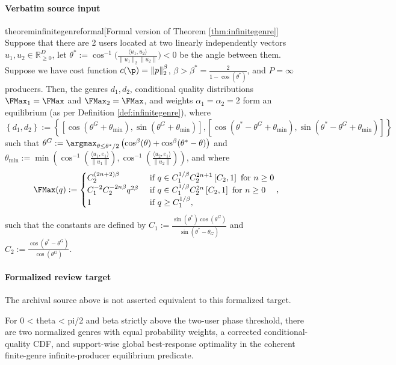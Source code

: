 \documentclass[10pt]{article}
\begin{document}
\paragraph{Verbatim source input}
\begin{ReviewVerbatim}
\begin{restatable}{theorem}{infinitegenreformal}[Formal version of Theorem \ref{thm:infinitegenre}]
\label{thm:infinitegenreformal}
Suppose that there are 2 users located at two linearly independently vectors $u_1, u_2 \in \mathbb{R}_{\ge 0}^D$, let $\theta^* := \cos^{-1}\Big( \frac{\langle u_1, u_2\rangle}{\|u_1\|_2 \|u_2\|} \Big) < 0$ be the angle between them.  Suppose we have cost function $c(\p) = \|p\|_2^{\beta}$, $\beta > \beta^* = \frac{2}{1 - \cos(\theta^*)}$, and $P = \infty$ producers. Then, the genres $d_1, d_2$, conditional quality distributions $\FMax_1 = \FMax$ and $\FMax_2 = \FMax$, and weights $\alpha_1 = \alpha_2 = 2$ form an equilibrium (as per  Definition \ref{def:infinitegenre}), where
\[\left\{d_1, d_2 \right\} := \left\{[\cos(\theta^G + \theta_{\text{min}}), \sin(\theta^G + \theta_{\text{min}})], [\cos(\theta^* - \theta^G + \theta_{\text{min}}), \sin(\theta^* - \theta^G + \theta_{\text{min}})] \right\} \]
such that $\theta^G := \argmax_{\theta \le \theta^*/2} \left(\cos^{\beta}(\theta) + \cos^{\beta}(\theta^* - \theta)\right)$ and $\theta_{\text{min}} := \min\left(\cos^{-1}\left(\frac{\langle u_1, e_1\rangle}{\|u_1\|} \right) , \cos^{-1}\left(\frac{\langle u_2, e_1\rangle}{\|u_2\|} \right) \right)$, and where
\[\FMax(q) :=
\begin{cases}
C_2^{(2n+2) \beta} & \text{ if } q \in C_1^{1/\beta} C_2^{2n+1}  \left[C_2, 1 \right] \text{ for } n \ge 0 \\
 C_1^{-2}C_2^{-2 n\beta} q^{2 \beta}  & \text{ if } q \in C_1^{1/\beta} C_2^{2n}  \left[C_2, 1 \right] \text{ for } n \ge 0 \\
1 & \text{ if } q \ge C_1^{1/\beta},
\end{cases},\]
such that the constants are defined by $C_1  := \frac{\sin(\theta^*) \cos(\theta^G)}{\sin(\theta^* - \theta_G)}$ and $C_2 := \frac{\cos(\theta^* - \theta^G)}{\cos(\theta^G)}$.
\end{restatable}
\end{ReviewVerbatim}


\paragraph{Formalized review target}
The archival source above is not asserted equivalent to this formalized target.
\begin{ReviewVerbatim}
For 0 < theta < pi/2 and beta strictly above the two-user phase threshold, there are two normalized genres with equal probability weights, a corrected conditional-quality CDF, and support-wise global best-response optimality in the coherent finite-genre infinite-producer equilibrium predicate.
\end{ReviewVerbatim}
\end{document}
